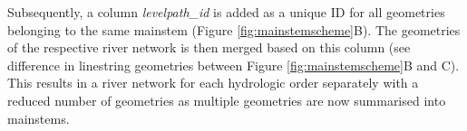 \documentclass[fleqn,10pt]{wlscirep}
\newenvironment{Shaded}{\begin{snugshade}}{\end{snugshade}}
\newcommand{\AttributeTok}[1]{\textcolor[rgb]{0.77,0.63,0.00}{#1}}
\newcommand{\ConstantTok}[1]{\textcolor[rgb]{0.00,0.00,0.00}{#1}}
\newcommand{\ControlFlowTok}[1]{\textcolor[rgb]{0.13,0.29,0.53}{\textbf{#1}}}
\newcommand{\DecValTok}[1]{\textcolor[rgb]{0.00,0.00,0.81}{#1}}
\newcommand{\FunctionTok}[1]{\textcolor[rgb]{0.00,0.00,0.00}{#1}}
\newcommand{\NormalTok}[1]{#1}
\newcommand{\OtherTok}[1]{\textcolor[rgb]{0.56,0.35,0.01}{#1}}
\newcommand{\SpecialCharTok}[1]{\textcolor[rgb]{0.00,0.00,0.00}{#1}}
\newcommand{\StringTok}[1]{\textcolor[rgb]{0.31,0.60,0.02}{#1}}
\begin{document}
\begin{Shaded}
\end{Shaded}

\normalsize

Subsequently, a column \emph{levelpath\_id} is added as a unique ID for all geometries belonging to the same mainstem (Figure \ref{fig:mainstemscheme}B). The geometries of the respective river network is then merged based on this column (see difference in linestring geometries between Figure \ref{fig:mainstemscheme}B and C). This results in a river network for each hydrologic order separately with a reduced number of geometries as multiple geometries are now summarised into mainstems.
\end{document}
